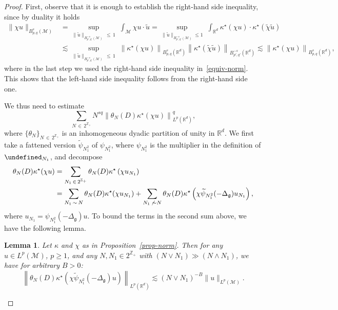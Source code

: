\documentclass[10pt,a4paper]{article}
\newtheorem{lemm}{Lemma}[section]
\newcommand{\Z}{\mathbb{Z}}
\newcommand{\R}{\mathbb{R}}
\let\P= \undefined
\newcommand{\P}{\mathbf{P}}
\newcommand{\M}{\mathcal{M}}
\newcommand{\g}{\mathfrak{g}}
\newcommand{\Dlg}{\Delta_{\g}}
\newcommand{\kk}{\kappa}
\newcommand{\wt}{\widetilde}
\newcommand{\les}{\lesssim}
\begin{document}
\begin{proof}
First, observe that it is enough to establish the right-hand side inequality, since by duality it holds
\begin{align*}
\|\chi u\|_{B^s_{p,q}(\M)} &= \sup_{\|\wt u\|_{B^{-s}_{p',q'}(\M)}\,\le\,1}\;\int_\M \chi u\cdot\wt u = \sup_{\|\wt u\|_{B^{-s}_{p',q'}(\M)}\le 1} \;\int_{\R^d} \kk^{\star}(\chi u)\cdot\kk^{\star}(\wt\chi\wt u)\\
& \les \sup_{\|\wt u\|_{B^{-s}_{p',q'}(\M)}\,\le\, 1}\;\left\|\kk^{\star}(\chi u)\right\|_{B^s_{p,q}(\R^d)} \left\|\kk^{\star}(\wt\chi\wt u)\right\|_{B^{-s}_{p',q'}(\R^d)} \les \left\|\kk^{\star}(\chi u)\right\|_{B^s_{p,q}(\R^d)},
\end{align*}
where in the last step we used the right-hand side inequality in~\eqref{equiv-norm}. This shows that the left-hand side inequality follows from the right-hand side one.

We thus need to estimate
\begin{equation*}
\sum_{N\,\in\,2^{\Z_+}}N^{sq}\left\|\theta_N(D)\kk^{\star}(\chi u)\right\|_{L^p(\R^d)}^q,
\end{equation*}
where $\{\theta_N\}_{N\,\in\,2^{\Z_+}}$ is an inhomogeneous dyadic partition of unity in $\R^d$. We first take a fattened version $\widetilde{\psi}_{N_1^2}$ of $\psi_{N_1^2}$, where $\psi_{N_1^2}$ is the multiplier in the definition of $\P_{N_1}$, and decompose
\begin{align*}
\theta_N(D)\kk^{\star}(\chi u) &= \sum_{N_1\,\in \,2^{\Z_+}}\theta_N(D)\kk^{\star}\left(\chi u_{N_1}\right)\\
&=\sum_{N_1\,\sim\,N}\theta_N(D)\kk^{\star}(\chi u_{N_1})+\sum_{N_1\,\not\,\sim N}\theta_N(D)\kk^{\star}\left(\chi\widetilde{\psi}_{N_1^2}(-\Dlg)u_{N_1}\right),
\end{align*}
where $u_{N_1}=\psi_{N_1^2}(-\Dlg)u$. To bound the terms in the second sum above, we have the following lemma.

\begin{lemm}\label{LEM:Picasso}
Let $\kk$ and $\chi$ as in Proposition~\ref{prop-norm}. Then for any $u\in L^p(\M)$, $p\geq 1$, and any $N,N_1\in 2^{\Z_+}$ with $(N\vee N_1)\gg (N\wedge N_1)$, we have for arbitrary $B>0$:
\begin{equation}\label{estim-key-norm}
\left\|\theta_N(D)\kk^{\star}\left(\chi\widetilde{\psi}_{N_1^2}(-\Dlg)u\right)\right\|_{L^p(\R^d)}\les (N\vee N_1)^{-B}\|u\|_{L^p(\M)}.
\end{equation}
\end{lemm}


\end{proof}
\end{document}
